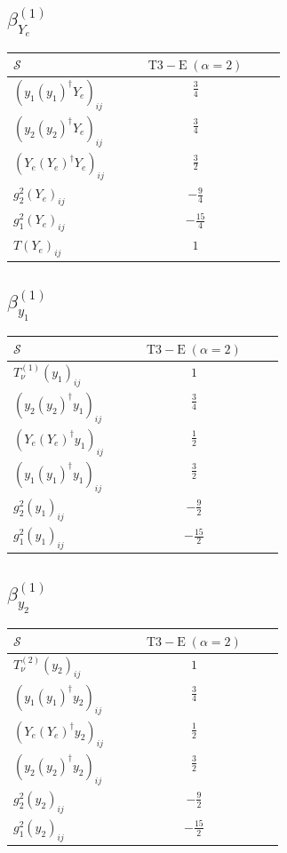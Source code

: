 \documentclass[9pt]{article}
\begin{document}
\subsection*{$ \beta_{Y_e}^{(1)} $}
\begin{longtable}{@{}p{0.38\linewidth}c@{}}
\toprule
$\mathcal{S}$ & $ \mathrm{T3-E}\;(\alpha=2) $ \\
\midrule
$ (y_1 (y_1)^{\dagger} Y_e)_{ij} $ & $ \frac{3}{4} $ \\
$ (y_2 (y_2)^{\dagger} Y_e)_{ij} $ & $ \frac{3}{4} $ \\
$ (Y_e (Y_e)^{\dagger} Y_e)_{ij} $ & $ \frac{3}{2} $ \\
$ g_2^2 (Y_e)_{ij} $ & $ - \frac{9}{4} $ \\
$ g_1^2 (Y_e)_{ij} $ & $ - \frac{15}{4} $ \\
$ T (Y_e)_{ij} $ & $ 1 $ \\
\bottomrule
\end{longtable}
\subsection*{$ \beta_{y_1}^{(1)} $}
\begin{longtable}{@{}p{0.38\linewidth}c@{}}
\toprule
$\mathcal{S}$ & $ \mathrm{T3-E}\;(\alpha=2) $ \\
\midrule
$ T_{\nu}^{(1)} (y_1)_{ij} $ & $ 1 $ \\
$ (y_2 (y_2)^{\dagger} y_1)_{ij} $ & $ \frac{3}{4} $ \\
$ (Y_e (Y_e)^{\dagger} y_1)_{ij} $ & $ \frac{1}{2} $ \\
$ (y_1 (y_1)^{\dagger} y_1)_{ij} $ & $ \frac{3}{2} $ \\
$ g_2^2 (y_1)_{ij} $ & $ - \frac{9}{2} $ \\
$ g_1^2 (y_1)_{ij} $ & $ - \frac{15}{2} $ \\
\bottomrule
\end{longtable}
\subsection*{$ \beta_{y_2}^{(1)} $}
\begin{longtable}{@{}p{0.38\linewidth}c@{}}
\toprule
$\mathcal{S}$ & $ \mathrm{T3-E}\;(\alpha=2) $ \\
\midrule
$ T_{\nu}^{(2)} (y_2)_{ij} $ & $ 1 $ \\
$ (y_1 (y_1)^{\dagger} y_2)_{ij} $ & $ \frac{3}{4} $ \\
$ (Y_e (Y_e)^{\dagger} y_2)_{ij} $ & $ \frac{1}{2} $ \\
$ (y_2 (y_2)^{\dagger} y_2)_{ij} $ & $ \frac{3}{2} $ \\
$ g_2^2 (y_2)_{ij} $ & $ - \frac{9}{2} $ \\
$ g_1^2 (y_2)_{ij} $ & $ - \frac{15}{2} $ \\
\bottomrule
\end{longtable}
\end{document}
